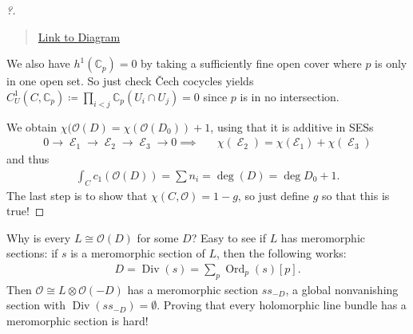 \begin{proof}[?]
\begin{quote}
\href{https://q.uiver.app/?q=WzAsOCxbMCwwLCIwIl0sWzIsMCwiSF4wKCBcXE9PKERfMCkgKSJdLFs0LDAsIkheMCggXFxPTyhEKSApIl0sWzYsMCwiSF4wKCBcXE9PKFxcQ0NfcCkgKSJdLFsyLDIsIkheMSggXFxPTyhEXzApICkiXSxbNCwyLCJIXjEoIFxcT08oRCkgKSJdLFs2LDIsIkheMSggXFxPTyhcXENDX3ApICkgPSAwIl0sWzgsMiwiMCJdLFszLDRdLFs2LDddLFswLDFdLFsxLDJdLFsyLDNdLFs0LDVdLFs1LDZdXQ==}{Link
to Diagram}
\end{quote}

We also have \(h^1({\mathbb{C}}_p) = 0\) by taking a sufficiently fine
open cover where \(p\) is only in one open set. So just check Čech
cocycles yields
\(C_U^1(C, {\mathbb{C}}_p) \coloneqq\prod_{i<j} {\mathbb{C}}_p(U_i \cap U_j) = 0\)
since \(p\) is in no intersection.

\begin{figure}
\centering
{}
\end{figure}

We obtain \(\chi( {\mathcal{O}}(D) = \chi( {\mathcal{O}}(D_0) ) + 1\),
using that it is additive in SESs
\begin{align*}
0 \to 
\operatorname{\mathcal{E}}_1 \to
\operatorname{\mathcal{E}}_2 \to
\operatorname{\mathcal{E}}_3 \to
0
\implies && 
\chi(\operatorname{\mathcal{E}}_2) = \chi( \operatorname{\mathcal{E_1}}) + \chi( \operatorname{\mathcal{E}}_3 )
\end{align*}
and thus
\begin{align*}
\int_C c_1 ({\mathcal{O}}(D) ) = \sum n_i = \deg(D) = \deg D_0 + 1
.\end{align*}
The last step is to show that \(\chi(C, {\mathcal{O}}) = 1-g\), so just
define \(g\) so that this is true!

\end{proof}

\begin{remark}

Why is every \(L \cong {\mathcal{O}}(D)\) for some \(D\)? Easy to see if
\(L\) has meromorphic sections: if \(s\) is a meromorphic section of
\(L\), then the following works:
\begin{align*}
D = \operatorname{Div}(s) = \sum_p {\operatorname{Ord}}_p(s) [p]
.\end{align*}
Then \({\mathcal{O}}\cong L\otimes{\mathcal{O}}(-D)\) has a meromorphic
section \(s s_{-D}\), a global nonvanishing section with
\(\operatorname{Div}(s s_{-D} ) = \emptyset\). Proving that every
holomorphic line bundle has a meromorphic section is hard!

\end{remark}

